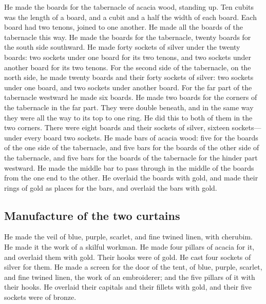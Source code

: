  He made the boards for the tabernacle of acacia wood,
standing up.  Ten cubits was the length of a board, and a
cubit and a half the width of each board.  Each board had
two tenons, joined to one another. He made all the boards of the
tabernacle this way.  He made the boards for the
tabernacle, twenty boards for the south side southward. 
He made forty sockets of silver under the twenty boards: two sockets
under one board for its two tenons, and two sockets under another board
for its two tenons.  For the second side of the
tabernacle, on the north side, he made twenty boards  and
their forty sockets of silver: two sockets under one board, and two
sockets under another board.  For the far part of the
tabernacle westward he made six boards.  He made two
boards for the corners of the tabernacle in the far part.
 They were double beneath, and in the same way they were
all the way to its top to one ring. He did this to both of them in the
two corners.  There were eight boards and their sockets
of silver, sixteen sockets---under every board two sockets.
 He made bars of acacia wood: five for the boards of the
one side of the tabernacle,  and five bars for the boards
of the other side of the tabernacle, and five bars for the boards of the
tabernacle for the hinder part westward.  He made the
middle bar to pass through in the middle of the boards from the one end
to the other.  He overlaid the boards with gold, and made
their rings of gold as places for the bars, and overlaid the bars with
gold.

\hypertarget{manufacture-of-the-two-curtains}{%
\subsection{Manufacture of the two
curtains}\label{manufacture-of-the-two-curtains}}

 He made the veil of blue, purple, scarlet, and fine
twined linen, with cherubim. He made it the work of a skilful workman.
 He made four pillars of acacia for it, and overlaid them
with gold. Their hooks were of gold. He cast four sockets of silver for
them.  He made a screen for the door of the tent, of
blue, purple, scarlet, and fine twined linen, the work of an
embroiderer;  and the five pillars of it with their
hooks. He overlaid their capitals and their fillets with gold, and their
five sockets were of bronze.


